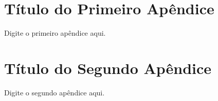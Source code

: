 \documentclass[a4paper,reqno,12pt,oneside]{book}
\begin{document}
\backmatter \appendix


\chapter{Título do Primeiro Apêndice}

Digite o primeiro apêndice aqui.


\chapter{Título do Segundo Apêndice}

Digite o segundo apêndice aqui.







\printnoidxglossaries
\end{document}
